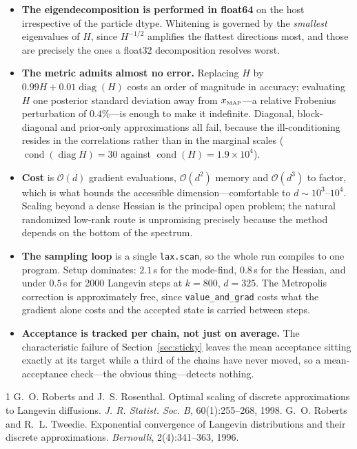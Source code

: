 \documentclass[11pt]{article}
\newcommand{\xmap}{x_{\text{\tiny MAP}}}
\newcommand{\code}[1]{\texttt{\small #1}}
\begin{document}
\begin{itemize}[leftmargin=1.3em,itemsep=3pt]
  \item \textbf{The eigendecomposition is performed in float64} on the host irrespective of the
  particle dtype. Whitening is governed by the \emph{smallest} eigenvalues of $H$, since
  $H^{-1/2}$ amplifies the flattest directions most, and those are precisely the ones a float32
  decomposition resolves worst.

  \item \textbf{The metric admits almost no error.} Replacing $H$ by
  $0.99H + 0.01\operatorname{diag}(H)$ costs an order of magnitude in accuracy; evaluating $H$ one
  posterior standard deviation away from $\xmap$---a relative Frobenius perturbation of
  $0.4\%$---is enough to make it indefinite. Diagonal, block-diagonal and prior-only
  approximations all fail, because the ill-conditioning resides in the correlations rather than in
  the marginal scales ($\operatorname{cond}(\operatorname{diag} H)=30$ against
  $\operatorname{cond}(H)=1.9\times10^4$).

  \item \textbf{Cost} is $\mathcal{O}(d)$ gradient evaluations, $\mathcal{O}(d^2)$ memory and
  $\mathcal{O}(d^3)$ to factor, which is what bounds the accessible dimension---comfortable to
  $d\sim 10^3$--$10^4$. Scaling beyond a dense Hessian is the principal open problem; the natural
  randomized low-rank route is unpromising precisely because the method depends on the bottom of
  the spectrum.

  \item \textbf{The sampling loop} is a single \code{lax.scan}, so the whole run compiles to one
  program. Setup dominates: $2.1$\,s for the mode-find, $0.8$\,s for the Hessian, and under
  $0.5$\,s for 2000 Langevin steps at $k=800$, $d=325$. The Metropolis correction is
  approximately free, since \code{value\_and\_grad} costs what the gradient alone costs and the
  accepted state is carried between steps.

  \item \textbf{Acceptance is tracked per chain, not just on average.} The characteristic
  failure of Section~\ref{sec:sticky} leaves the mean acceptance sitting exactly at its target
  while a third of the chains have never moved, so a mean-acceptance check---the obvious
  thing---detects nothing.
\end{itemize}

\begin{thebibliography}{1}
 G.~O. Roberts and J.~S. Rosenthal.
Optimal scaling of discrete approximations to Langevin diffusions.
\emph{J. R. Statist. Soc. B}, 60(1):255--268, 1998.
 G.~O. Roberts and R.~L. Tweedie.
Exponential convergence of Langevin distributions and their discrete approximations.
\emph{Bernoulli}, 2(4):341--363, 1996.
\end{thebibliography}
\end{document}
